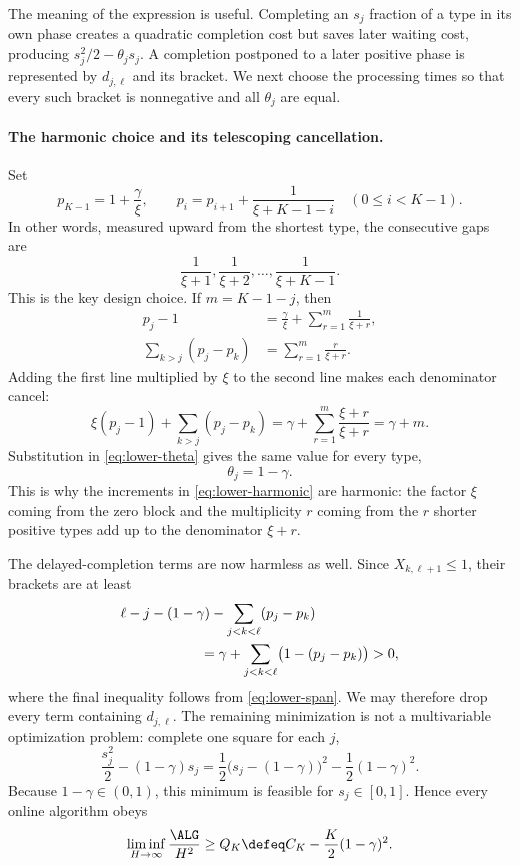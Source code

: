 The meaning of the expression is useful.  Completing an $s_j$ fraction of a
type in its own phase creates a quadratic completion cost but saves later
waiting cost, producing $s_j^2/2-\theta_js_j$.  A completion postponed to a
later positive phase is represented by $d_{j,\ell}$ and its bracket.  We next
choose the processing times so that every such bracket is nonnegative and all
$\theta_j$ are equal.

\paragraph{The harmonic choice and its telescoping cancellation.}
Set
\begin{equation}
  p_{K-1}=1+\frac{\gamma}{\xi},
  \qquad
  p_i=p_{i+1}+\frac1{\xi+K-1-i}
  \quad(0\le i<K-1).
  \label{eq:lower-harmonic}
\end{equation}
In other words, measured upward from the shortest type, the consecutive gaps
are
\[
  \frac1{\xi+1},\frac1{\xi+2},\ldots,\frac1{\xi+K-1}.
\]
This is the key design choice.  If $m=K-1-j$, then
\begin{align*}
 p_j-1
   &=\frac\gamma \xi+\sum_{r=1}^m\frac1{\xi+r},\\
 \sum_{k>j}(p_j-p_k)
   &=\sum_{r=1}^m\frac{r}{\xi+r}.
\end{align*}
Adding the first line multiplied by $\xi$ to the second line makes each
denominator cancel:
\begin{equation}
 \xi(p_j-1)+\sum_{k>j}(p_j-p_k)
 =\gamma+\sum_{r=1}^m\frac{\xi+r}{\xi+r}
 =\gamma+m.
 \label{eq:lower-telescope}
\end{equation}
Substitution in \cref{eq:lower-theta} gives the same value for every type,
\begin{equation}
  \theta_j=1-\gamma.
  \label{eq:lower-theta-constant}
\end{equation}
This is why the increments in \cref{eq:lower-harmonic} are harmonic: the
factor $\xi$ coming from the zero block and the multiplicity $r$ coming from the
$r$ shorter positive types add up to the denominator $\xi+r$.

The delayed-completion terms are now harmless as well.  Since
$X_{k,\ell+1}\le1$, their brackets are at least
\begin{align*}
 &\ell-j-(1-\gamma)
   -\sum_{j<k<\ell}(p_j-p_k)\\
 &\hspace{20mm}
 =\gamma+\sum_{j<k<\ell}\bigl(1-(p_j-p_k)\bigr)>0,
\end{align*}
where the final inequality follows from
\cref{eq:lower-span}.  We may therefore drop every term containing
$d_{j,\ell}$.  The remaining minimization is not a multivariable optimization
problem: complete one square for each $j$,
\[
  \frac{s_j^2}{2}-(1-\gamma)s_j
  =\frac12\bigl(s_j-(1-\gamma)\bigr)^2
   -\frac12(1-\gamma)^2.
\]
Because $1-\gamma\in(0,1)$, this minimum is feasible for
$s_j\in[0,1]$.  Hence every online algorithm obeys
\begin{equation}
 \liminf_{H\to\infty}\frac{\ALG}{H^2}
 \ge Q_K
 \defeq C_K-\frac K2(1-\gamma)^2.
 \label{eq:lower-QK}
\end{equation}

